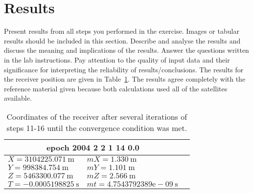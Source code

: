 \section{Results} %
\label{sec:results}

Present results from all steps you performed in the exercise. Images or tabular results should be included in this section. Describe and analyse the results and discuss the meaning and implications of the results. Answer the questions written in the lab instructions. Pay attention to the quality of input data and their significance for interpreting the reliability of results/conclusions.
The results for the receiver position are given in Table~\ref{tab:receiverCoordinates}.  The results agree completely with the reference material given because both calculations used all of the satellites available.
\begin{table}[h]
	\begin{center}
		\begin{tabular}{llr}
		\toprule
		\multicolumn{2}{c}{epoch 2004 2 2 1 14 0.0} \\
		\midrule
			$X = 3104225.071~\text{m}$	& $mX =$$   1.330~\text{m}$		\\
			$Y = 998384.754~\text{m}$	& $mY =   1.101~\text{m}$		\\
			$Z = 5463300.077~\text{m}$	& $mZ =   2.566~\text{m}$		\\
			$T = -0.0005198825~\text{s}$ 	& $mt = 4.7543792389\text{e}-09~\text{s}$		\\
		\bottomrule
		\end{tabular}
	\end{center}
	\caption{Coordinates of the receiver after several iterations of steps 11-16 until the convergence condition was met.}
	\label{tab:receiverCoordinates}
\end{table}

